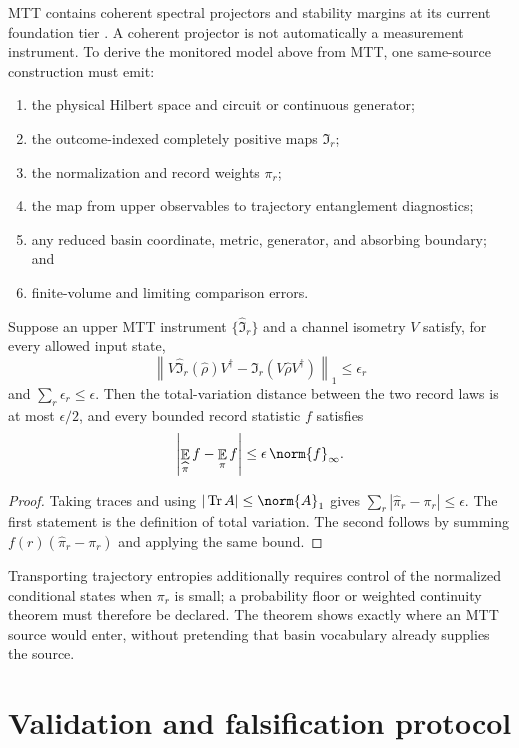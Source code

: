\documentclass[11pt]{article}
\DeclareMathOperator{\Tr}{Tr}
\DeclareMathOperator{\E}{\mathbb E}
\newcommand{\Inst}{\mathfrak I}
\begin{document}
MTT contains coherent spectral projectors and stability margins at its
current foundation tier \cite{nero_foundation}.  A coherent projector is
not automatically a measurement instrument.  To derive the monitored
model above from MTT, one same-source construction must emit:
\begin{enumerate}
\item the physical Hilbert space and circuit or continuous generator;
\item the outcome-indexed completely positive maps $\Inst_r$;
\item the normalization and record weights $\pi_r$;
\item the map from upper observables to trajectory entanglement
diagnostics;
\item any reduced basin coordinate, metric, generator, and absorbing
boundary; and
\item finite-volume and limiting comparison errors.
\end{enumerate}

\begin{theorem}\label{thm:transport}
Suppose an upper MTT instrument
$\{\widehat{\Inst}_r\}$ and a channel isometry $V$ satisfy, for every
allowed input state,
\[
 \left\|
 V\widehat{\Inst}_r(\widehat\rho)V^\dagger
 -\Inst_r(V\widehat\rho V^\dagger)
 \right\|_1\leq\epsilon_r
\]
and $\sum_r\epsilon_r\leq\epsilon$.  Then the total-variation distance
between the two record laws is at most $\epsilon/2$, and every bounded
record statistic $f$ satisfies
\[
 \left|\E_{\widehat\pi}f-\E_{\pi}f\right|
 \leq \epsilon\,\norm{f}_\infty .
\]
\end{theorem}

\begin{proof}
Taking traces and using
$|\Tr A|\leq\norm{A}_1$ gives
$\sum_r|\widehat\pi_r-\pi_r|\leq\epsilon$.  The first statement is the
definition of total variation.  The second follows by summing
$f(r)(\widehat\pi_r-\pi_r)$ and applying the same bound.
\end{proof}

Transporting trajectory entropies additionally requires control of the
normalized conditional states when $\pi_r$ is small; a probability floor
or weighted continuity theorem must therefore be declared.  The theorem
shows exactly where an MTT source would enter, without pretending that
basin vocabulary already supplies the source.

\section{Validation and falsification protocol}
\end{document}
